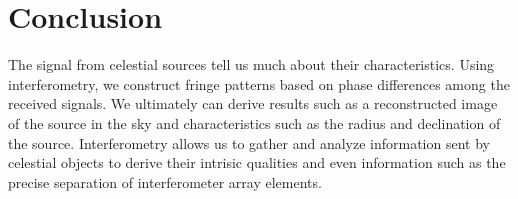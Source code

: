 \documentclass{article}
\begin{document}
\section{Conclusion}
The signal from celestial sources tell us much about their
characteristics. Using interferometry, we construct fringe patterns
based on phase differences among the received signals. We ultimately can 
derive results such as a reconstructed image of the source in the sky
and characteristics such as the radius and declination of the
source. Interferometry allows us to gather and analyze information sent
by celestial objects to derive their intrisic qualities and even
information such as the precise separation of interferometer array
elements.  
\end{document}
